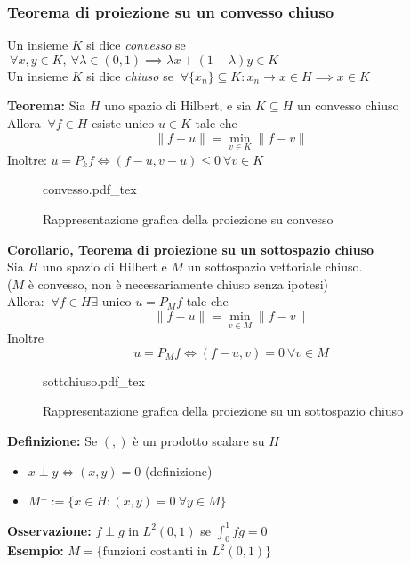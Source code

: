 \documentclass[a4paper]{article}
\newcommand{\incfig}[1]{%
	\def\svgwidth{\columnwidth}
	{#1.pdf_tex}
}
\begin{document}
\subsubsection{Teorema di proiezione su un convesso chiuso}
Un insieme $K$ si dice \emph{convesso} se $\ \forall x,y\in K,\ \forall \lambda\in (0,1)\implies \lambda x +(1-\lambda)y\in K$
\\Un insieme $K$ si dice \emph{chiuso} se $\ \forall \{x_n\} \subseteq  K:x_n\to x\in H\implies x\in K$
\begin{tcolorbox}
\textbf{Teorema: }Sia $H$ uno spazio di Hilbert, e sia $K\subseteq  H$ un convesso chiuso
\\Allora $\ \forall f\in H$ esiste unico $u\in K$ tale che
\[\|f-u\|=\min_{v\in K}\|f-v\|\]
Inoltre: $u=P_kf\iff (f-u,v-u)\le 0 \ \forall v\in K$
\end{tcolorbox}
\begin{figure}[ht]
    \centering
    \incfig{convesso}
    \caption{Rappresentazione grafica della proiezione su convesso}
    \label{fig:convesso}
\end{figure}
\begin{tcolorbox}
\textbf{Corollario, Teorema di proiezione su un sottospazio chiuso}
\\Sia $H$ uno spazio di Hilbert e $M$ un sottospazio vettoriale chiuso.
\\($M$ è convesso, non è necessariamente chiuso senza ipotesi)
\\Allora: $\ \forall f\in H\exists \text{ unico }u=P_Mf$ tale che
\[\|f-u\|=\min_{v\in M}\|f-v\|\]
Inoltre 
\[u=P_Mf  \iff (f-u,v)=0\ \forall v\in M\]
\end{tcolorbox}
\begin{figure}[ht]
    \centering
    \incfig{sottchiuso}
    \caption{Rappresentazione grafica della proiezione su un sottospazio chiuso}
    \label{fig:sottchiuso}
\end{figure}
\begin{tcolorbox}
	\textbf{Definizione: }Se $(,)$ è un prodotto scalare su $H$ 
	\begin{itemize}
		\item $x\perp y \iff (x,y)=0$ (definizione)
		\item $M^{\perp}:=\{x\in H:(x,y)=0 \ \forall y\in M\} $
	\end{itemize}
\end{tcolorbox}
\textbf{Osservazione: }$f\perp g$ in $L^{2}(0,1)$ se $\int_{0}^{1} fg=0 $ 
\\\textbf{Esempio:} $M=\{\text{funzioni costanti in }L^{2}(0,1)\} $
\end{document}
